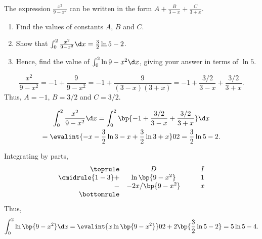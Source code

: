 \clearpage
\begin{problem}
    The expression $\frac{x^2}{9-x^2}$ can be written in the form $A + \frac{B}{3 - x} + \frac{C}{3 + x}$.
        
    \begin{enumerate}
        \item Find the values of constants $A$, $B$ and $C$.
        \item Show that $\int_0^2 \frac{x^2}{9-x^2} \d x = \frac32 \ln 5 - 2$.
        \item Hence, find the value of $\int_0^2 \ln{9-x^2} \d x$, giving your answer in terms of $\ln 5$.
    \end{enumerate}
\end{problem}
\begin{solution}
    \begin{ppart}
        \[\frac{x^2}{9-x^2} = -1 + \frac9{9 - x^2} = -1 + \frac9{(3-x)(3+x)} = -1 + \frac{3/2}{3-x} + \frac{3/2}{3 + x}.\] Thus, $A = -1$, $B = 3/2$ and $C = 3/2$.
    \end{ppart}
    \begin{ppart}
        \begin{gather*}
            \int_0^2 \frac{x^2}{9-x^2} \d x = \int_0^2 \bp{-1 + \frac{3/2}{3-x} + \frac{3/2}{3 + x}} \d x \\
            = \evalint{-x -\frac32 \ln{3 - x} + \frac32 \ln{3 + x}}02 = \frac32\ln5 - 2.
        \end{gather*}
    \end{ppart}
    \begin{ppart}
        Integrating by parts,
        \[
            \begin{array}{r c @{\hspace*{1.0cm}} c}\toprule
                & D & I \\\cmidrule{1-3}
                + & \ln\bp{9 - x^2} & 1 \\
                - & -2x/\bp{9 - x^2} & x \\\bottomrule
            \end{array}
        \]
        Thus, \[\int_0^2 \ln\bp{9 - x^2} \d x = \evalint{x\ln\bp{9 - x^2}}02 + 2\bp{\frac32 \ln5 - 2} = 5\ln5 - 4.\]
    \end{ppart}
\end{solution}